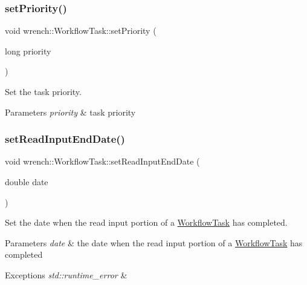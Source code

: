 \subsubsection{\texorpdfstring{set\+Priority()}{setPriority()}}
{\footnotesize\ttfamily void wrench\+::\+Workflow\+Task\+::set\+Priority (\begin{DoxyParamCaption}\item[{long}]{priority }\end{DoxyParamCaption})}



Set the task priority. 


\begin{DoxyParams}{Parameters}
{\em priority} & task priority \\
\hline
\end{DoxyParams}
\mbox{\label{classwrench_1_1_workflow_task_a0f71670304b0f61a860f76512f60bcc5}} 
\subsubsection{\texorpdfstring{set\+Read\+Input\+End\+Date()}{setReadInputEndDate()}}
{\footnotesize\ttfamily void wrench\+::\+Workflow\+Task\+::set\+Read\+Input\+End\+Date (\begin{DoxyParamCaption}\item[{double}]{date }\end{DoxyParamCaption})}



Set the date when the read input portion of a \hyperlink{classwrench_1_1_workflow_task}{Workflow\+Task} has completed. 


\begin{DoxyParams}{Parameters}
{\em date} & the date when the read input portion of a \hyperlink{classwrench_1_1_workflow_task}{Workflow\+Task} has completed \\
\hline
\end{DoxyParams}

\begin{DoxyExceptions}{Exceptions}
{\em std\+::runtime\+\_\+error} & \\
\hline
\end{DoxyExceptions}
\mbox{\label{classwrench_1_1_workflow_task_a66da6332f9f636057a34448aebf017b3}} 
